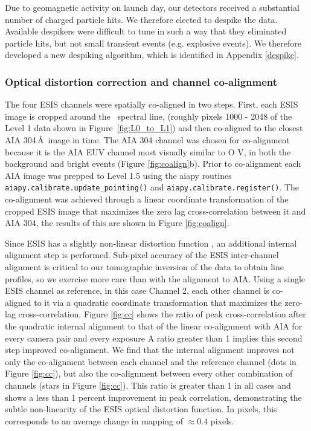 Due to geomagnetic activity on launch day, our detectors received a substantial number of charged particle hits. 
We therefore elected to despike the data.
Available despikers were difficult to tune in such a way that they eliminated particle hits, but not small transient events (e.g. explosive events). We therefore developed a new despiking algorithm, which is identified in Appendix \ref{despike}.

        
\subsubsection{Optical distortion correction and channel co-alignment}
   
  The four ESIS channels were spatially co-aligned in two steps.
First, each ESIS image is cropped around the \ov \ spectral line, (roughly pixels 1000 - 2048 of the Level 1 data shown in Figure~\ref{fig:L0_to_L1}) and then co-aligned to the closest AIA 304\,\AA\ image in time.  
The AIA 304 channel was chosen for co-alignment because it is the AIA EUV channel most visually similar to O V, in both the background and bright events (Figure \ref{fig:coalign}b).
Prior to co-alignment each AIA image was prepped to Level 1.5 using the aiapy routines \texttt{aiapy.calibrate.update\_pointing()} and \texttt{aiapy.calibrate.register()}.
The co-alignment was achieved through a linear coordinate transformation of the cropped ESIS image that maximizes the zero lag cross-correlation between it and AIA 304, the results of this are shown in Figure \ref{fig:coalign}.

Since ESIS has a slightly non-linear distortion function \citep{ESIS}, an additional internal alignment step is performed. 
Sub-pixel accuracy of the ESIS inter-channel alignment is critical to our tomographic inversion of the data to obtain line profiles, so we exercise more care than with the alignment to AIA.
Using a single ESIS channel as reference, in this case Channel 2, each other channel is co-aligned to it via a quadratic coordinate transformation that maximizes the zero-lag cross-correlation. 
Figure \ref{fig:cc} shows the ratio of peak cross-correlation after the quadratic internal alignment to that of the linear co-alignment with AIA for every camera pair and every exposure
A ratio greater than 1 implies this second step improved co-alignment.
We find that the internal alignment improves not only the co-alignment between each channel and the reference channel (dots in Figure \ref{fig:cc}), but also the co-alignment between every other combination of channels (stars in Figure \ref{fig:cc}).
This ratio is greater than 1 in all cases and shows a less than 1 percent improvement in peak correlation, demonstrating the subtle non-linearity of the ESIS optical distortion function.
In pixels, this corresponds to an average change in mapping of $\approx 0.4$ pixels.

